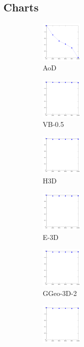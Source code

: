 \documentclass[a4paper,10pt]{article}
\begin{document}
\subsection{Charts}
\begin{figure}[ht]{\centering
\begin{subfigure}[b]{2.5cm}
\centering
\includegraphics[height=2cm]{allcat_AoD.pdf}
\caption{AoD}
\end{subfigure} 
\begin{subfigure}[b]{2.5cm}
\centering
\includegraphics[height=2cm]{allcat_VB-0_5.pdf}
\caption{VB-0.5}
\end{subfigure} 
\begin{subfigure}[b]{2.5cm}
\centering
\includegraphics[height=2cm]{allcat_H3D.pdf}
\caption{H3D}
\end{subfigure} 
\begin{subfigure}[b]{2.5cm}
\centering
\includegraphics[height=2cm]{allcat_E-3D.pdf}
\caption{E-3D}
\end{subfigure} 
\begin{subfigure}[b]{2.5cm}
\centering
\includegraphics[height=2cm]{allcat_GGeo-3D-2.pdf}
\caption{GGeo-3D-2}
\end{subfigure} 
\begin{subfigure}[b]{2.5cm}
\centering
\includegraphics[height=2cm]{allcat_GGeo-3D-1.pdf}

\end{subfigure}}
\end{figure}
\end{document}
